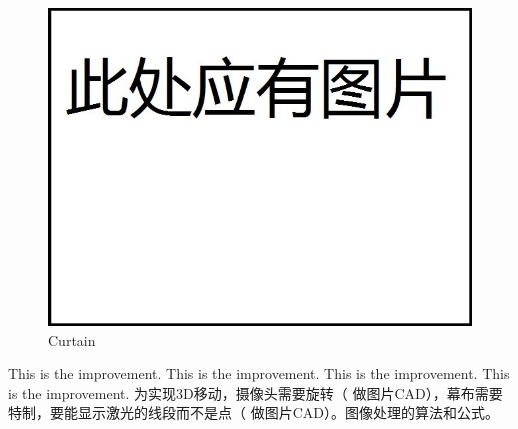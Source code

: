 \documentclass[12pt]{article}
\begin{document}
\begin{flushleft}
\begin{figure}[h!]
	\begin{center}
		\includegraphics[scale = 0.6]{curtain.jpg}
		\caption{Curtain}
	\end{center}
\end{figure}
This is the improvement. This is the improvement. This is the improvement. This is the improvement. 
为实现3D移动，摄像头需要旋转（ 做图片CAD），幕布需要特制，要能显示激光的线段而不是点（ 做图片CAD）。图像处理的算法和公式。


\end{flushleft}
\end{document}
